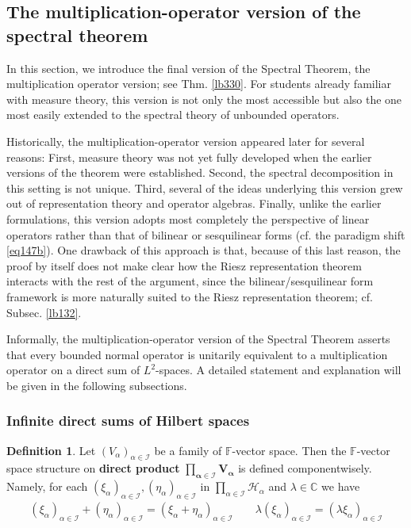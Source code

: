 \documentclass[12pt,b5paper,notitlepage]{article}
\theoremstyle{definition}
\newtheorem{df}{Definition}[subsection]
\theoremstyle{plain}
\newcommand{\Cbb}{\mathbb C}
\newcommand{\Fbb}{\mathbb F}
\newcommand{\MH}{\mathcal H}
\newcommand{\SI}{\mathscr I}
\numberwithin{equation}{section}
\begin{document}
\subsection{The multiplication-operator version of the spectral theorem}\label{lb426}


In this section, we introduce the final version of the Spectral Theorem, the multiplication operator version; see Thm. \ref{lb330}. For students already familiar with measure theory, this version is not only the most accessible but also the one most easily extended to the spectral theory of unbounded operators.

Historically, the multiplication-operator version appeared later for several reasons: First, measure theory was not yet fully developed when the earlier versions of the theorem were established. Second, the spectral decomposition in this setting is not unique. Third, several of the ideas underlying this version grew out of representation theory and operator algebras. Finally, unlike the earlier formulations, this version adopts most completely the perspective of linear operators rather than that of bilinear or sesquilinear forms (cf. the paradigm shift \eqref{eq147b}). One drawback of this approach is that, because of this last reason, the proof by itself does not make clear how the Riesz representation theorem interacts with the rest of the argument, since the bilinear/sesquilinear form framework is more naturally suited to the Riesz representation theorem; cf. Subsec. \ref{lb132}.

Informally, the multiplication-operator version of the Spectral Theorem asserts that every bounded normal operator is unitarily equivalent to a multiplication operator on a direct sum of $L^2$-spaces. A detailed statement and explanation will be given in the following subsections.




\subsubsection{Infinite direct sums of Hilbert spaces}

\begin{df}
Let $(V_\alpha)_{\alpha\in\SI}$ be a family of $\Fbb$-vector space. Then the $\Fbb$-vector space structure on \textbf{direct product}  $\pmb{\prod_{\alpha\in\SI}V_\alpha}$ is defined componentwisely. Namely, for each $(\xi_\alpha)_{\alpha\in\SI},(\eta_\alpha)_{\alpha\in\SI}$ in $\prod_{\alpha\in\SI}\MH_\alpha$ and $\lambda\in\Cbb$ we have
\begin{align*}
(\xi_\alpha)_{\alpha\in\SI}+(\eta_\alpha)_{\alpha\in\SI}=(\xi_\alpha+\eta_\alpha)_{\alpha\in\SI}\qquad  \lambda(\xi_\alpha)_{\alpha\in\SI}=(\lambda\xi_\alpha)_{\alpha\in\SI}
\end{align*}
\end{df}
\end{document}
